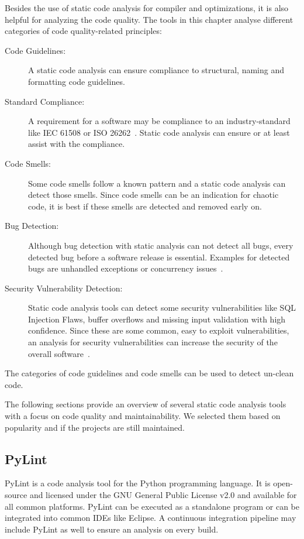 Besides the use of static code analysis for compiler and optimizations, it is also helpful for analyzing the code quality. The tools in this chapter analyse different categories of code quality-related principles:
\begin{description}
    \item[Code Guidelines:] A static code analysis can ensure compliance to structural, naming and formatting code guidelines. 
    \item[Standard Compliance:] A requirement for a software may be compliance to an industry-standard like IEC 61508 or ISO 26262~\cite{tc_65sc_65a_iec_2010-1,isotc_22sc_32_iso_2018}. Static code analysis can ensure or at least assist with the compliance.  
    \item[Code Smells:] Some code smells follow a known pattern and a static code analysis can detect those smells. Since code smells can be an indication for chaotic code, it is best if these smells are detected and removed early on.
    \item[Bug Detection:] Although bug detection with static analysis can not detect all bugs, every detected bug before a software release is essential. Examples for detected bugs are unhandled exceptions or concurrency issues~\cite{delaitre_evaluating_2015}.
    \item[Security Vulnerability Detection:] Static code analysis tools can detect some security vulnerabilities like SQL Injection Flaws, buffer overflows and missing input validation with high confidence. Since these are some common, easy to exploit vulnerabilities, an analysis for security vulnerabilities can increase the security of the overall software~\cite{wichers_source_nodate}.  
\end{description}
The categories of code guidelines and code smells can be used to detect un-clean code.

The following sections provide an overview of several static code analysis tools with a focus on code quality and maintainability. We selected them based on popularity and if the projects are still maintained.

\subsection{PyLint}
PyLint is a code analysis tool for the Python programming language. It is open-source and licensed under the GNU General Public License v2.0 and available for all common platforms. PyLint can be executed as a standalone program or can be integrated into common IDEs like Eclipse. A continuous integration pipeline may include PyLint as well to ensure an analysis on every build.

